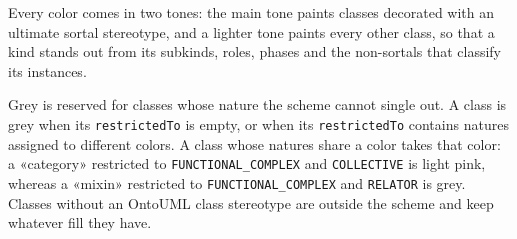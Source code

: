Every color comes in two tones: the main tone paints classes decorated with an ultimate sortal stereotype, and a lighter tone paints every other class, so that a kind stands out from its subkinds, roles, phases and the non-sortals that classify its instances.

Grey is reserved for classes whose nature the scheme cannot single out. A class is grey when its \texttt{restrictedTo} is empty, or when its \texttt{restrictedTo} contains natures assigned to different colors. A class whose natures share a color takes that color: a «category» restricted to \texttt{FUNCTIONAL\_COMPLEX} and \texttt{COLLECTIVE} is light pink, whereas a «mixin» restricted to \texttt{FUNCTIONAL\_COMPLEX} and \texttt{RELATOR} is grey. Classes without an OntoUML class stereotype are outside the scheme and keep whatever fill they have.

